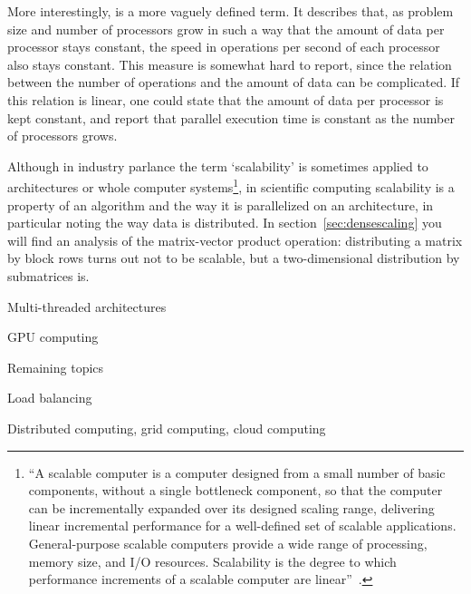 More interestingly,  is a more vaguely
defined term. It describes that, as problem size and number of
processors grow in such a way that the amount of data per processor
stays constant, the speed in operations per second of each processor
also stays constant. This measure is somewhat hard to report, since
the relation between the number of operations and the amount of data
can be complicated. If this relation is linear, one could state that
the amount of data per processor is kept constant, and report that parallel
execution time is constant as the number of processors grows.

Although in industry parlance the term `scalability' is sometimes
applied to architectures or whole computer systems\footnote {``A
  scalable computer is a computer designed from a small number of
  basic components, without a single bottleneck component, so that
  the computer can be incrementally expanded over its designed scaling
  range, delivering linear incremental performance for a well-defined
  set of scalable applications.  General-purpose scalable computers
  provide a wide range of processing, memory size, and I/O
  resources.  Scalability is the degree to which performance
  increments of a scalable computer are linear''~\cite{Bell:outlook}.},
%
in scientific computing
scalability is a property of an algorithm and the way it is
parallelized on an architecture, in
particular noting the way data is distributed. In
section~\ref{sec:densescaling} you will find an analysis of the
matrix-vector product operation: distributing a matrix by block rows
turns out not to be scalable, but a two-dimensional distribution by
submatrices is.


 {Multi-threaded architectures}
\label{sec:mta}


\begin{gpu}
 {GPU computing}
\label{sec:gpu}

\end{gpu}

 {Remaining topics}

 {Load balancing}
\label{sec:load}

 
 {Distributed computing, grid computing, cloud
  computing}
\label{sec:cloud}


